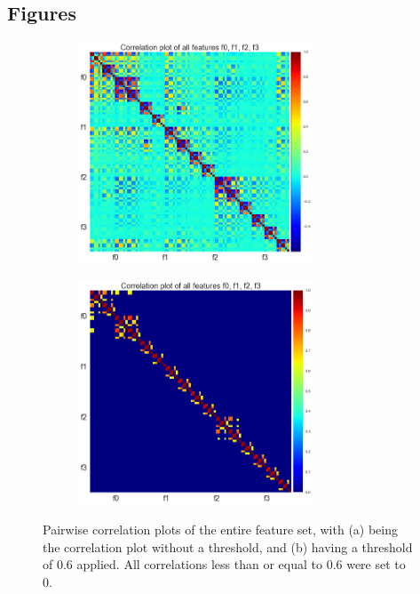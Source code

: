\documentclass{article}
\begin{document}
\subsection{Figures}
\begin{figure}[!htb]
  \centering 
  \begin{subfigure}[b]{0.49\textwidth}
    \includegraphics[width=70mm]{figures/corrplot.png}
    \caption{}
    \label{fig:figure1a}
  \end{subfigure}
  \begin{subfigure}[b]{0.49\textwidth}
    \includegraphics[width=70mm]{figures/thresholdcorrplot.png}
    \caption{}
    \label{fig:figure1b}
  \end{subfigure}
  \caption{Pairwise correlation plots of the entire feature set, with (a) being the correlation plot without a threshold, and (b) having a threshold of 0.6 applied. All correlations less than or equal to 0.6 were set to 0.}
  \label{fig:figure1}
\end{figure}
\end{document}
